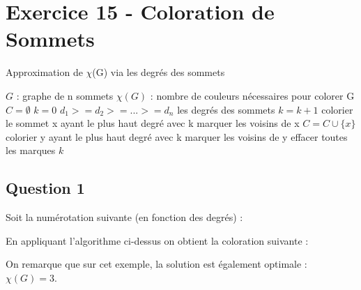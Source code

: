 
\section{Exercice 15 - Coloration de Sommets}\label{ex15}

\begin{center}
\begin{algorithm}[H]
\caption{Approximation de $\chi$(G) via les degr\'es des sommets}\label{ex15_algo}
\begin{algorithmic}[1]
\REQUIRE $G$ : graphe de n sommets
\ENSURE $\chi(G)$ : nombre de couleurs n\'ecessaires pour colorer G
\STATE $C = \emptyset$
\STATE $k = 0$ 
\STATE $d_1 >= d_2 >= ... >= d_n$ les degr\'es des sommets
\REPEAT
	\STATE $k = k+1$
	\STATE colorier le sommet x ayant le plus haut degr\'e avec k
	\STATE marquer les voisins de x
	\STATE $C = C \cup \{x\}$
		\STATE colorier y ayant le plus haut degr\'e avec k
		\STATE marquer les voisins de y
	\ENDWHILE
	\STATE effacer toutes les marques
\RETURN $k$
\end{algorithmic}
\end{algorithm}
\end{center}

\subsection{Question 1}\label{ex15_q1}
Soit la num\'erotation suivante (en fonction des degr\'es) :


En appliquant l'algorithme ci-dessus on obtient la coloration suivante :


On remarque que sur cet exemple, la solution est \'egalement optimale : $\chi(G) = 3$.

